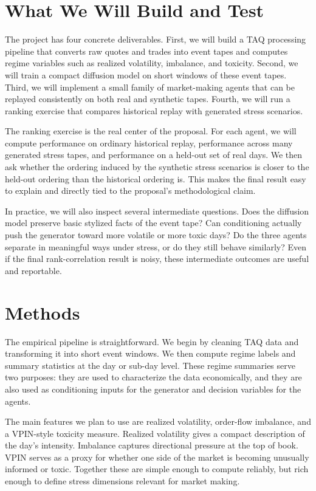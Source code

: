 \documentclass[10pt,letterpaper,twocolumn]{article}
\begin{document}
\section{What We Will Build and Test}

The project has four concrete deliverables. First, we will build a TAQ processing pipeline that converts raw quotes and trades into event tapes and computes regime variables such as realized volatility, imbalance, and toxicity. Second, we will train a compact diffusion model on short windows of these event tapes. Third, we will implement a small family of market-making agents that can be replayed consistently on both real and synthetic tapes. Fourth, we will run a ranking exercise that compares historical replay with generated stress scenarios.

The ranking exercise is the real center of the proposal. For each agent, we will compute performance on ordinary historical replay, performance across many generated stress tapes, and performance on a held-out set of real days. We then ask whether the ordering induced by the synthetic stress scenarios is closer to the held-out ordering than the historical ordering is. This makes the final result easy to explain and directly tied to the proposal's methodological claim.

In practice, we will also inspect several intermediate questions. Does the diffusion model preserve basic stylized facts of the event tape? Can conditioning actually push the generator toward more volatile or more toxic days? Do the three agents separate in meaningful ways under stress, or do they still behave similarly? Even if the final rank-correlation result is noisy, these intermediate outcomes are useful and reportable.

\section{Methods}

The empirical pipeline is straightforward. We begin by cleaning TAQ data and transforming it into short event windows. We then compute regime labels and summary statistics at the day or sub-day level. These regime summaries serve two purposes: they are used to characterize the data economically, and they are also used as conditioning inputs for the generator and decision variables for the agents.

The main features we plan to use are realized volatility, order-flow imbalance, and a VPIN-style toxicity measure. Realized volatility gives a compact description of the day's intensity. Imbalance captures directional pressure at the top of book. VPIN serves as a proxy for whether one side of the market is becoming unusually informed or toxic. Together these are simple enough to compute reliably, but rich enough to define stress dimensions relevant for market making.
\end{document}
